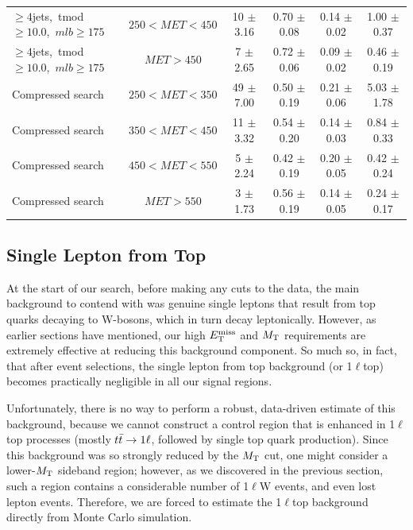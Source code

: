 \begin{table}
\begin{tabular}{|l|c|c|c|c|c|}
\hline
 $\ge4$jets,~tmod$\ge10.0$,~$mlb\ge175$    & $250<MET<450$ & 10 $\pm$ 3.16   & 0.70 $\pm$ 0.08  & 0.14 $\pm$ 0.02 & 1.00 $\pm$ 0.37 \\
 $\ge4$jets,~tmod$\ge10.0$,~$mlb\ge175$    & $MET>450$     & 7 $\pm$ 2.65    & 0.72 $\pm$ 0.06  & 0.09 $\pm$ 0.02 & 0.46 $\pm$ 0.19 \\
\hline
Compressed search & $250<MET<350$  & 49 $\pm$ 7.00  & 0.50 $\pm$ 0.19  & 0.21 $\pm$ 0.06  & 5.03 $\pm$ 1.78  \\
Compressed search & $350<MET<450$  & 11 $\pm$ 3.32  & 0.54 $\pm$ 0.20  & 0.14 $\pm$ 0.03  & 0.84 $\pm$ 0.33  \\
Compressed search & $450<MET<550$  & 5 $\pm$ 2.24   & 0.42 $\pm$ 0.19  & 0.20 $\pm$ 0.05  & 0.42 $\pm$ 0.24  \\
Compressed search & $MET>550$      & 3 $\pm$ 1.73  & 0.56 $\pm$ 0.19  & 0.14 $\pm$ 0.05  & 0.24 $\pm$ 0.17  \\
\hline
\end{tabular}
\end{table}

\subsection{Single Lepton from Top}
\label{ssec:stop:1ltop}

At the start of our search, before making any cuts to the data, the
main background to contend with was genuine single leptons that result
from top quarks decaying to W-bosons, which in turn decay
leptonically. However, as earlier sections have mentioned, our high
$E_\text{T}^\text{miss}$ and $M_\text{T}$ requirements are extremely effective at reducing this
background component. So much so, in fact, that after event
selections, the single lepton from top background (or 1$\ell$top) becomes
practically negligible in all our signal regions.

Unfortunately, there is no way to perform a robust, data-driven
estimate of this background, because we cannot construct a control
region that is enhanced in 1$\ell$top processes (mostly $t\bar{t} \rightarrow 1\ell$,
followed by single top quark production). Since this background was so
strongly reduced by the $M_\text{T}$ cut, one might consider a lower-$M_\text{T}$
sideband region; however, as we discovered in the previous section,
such a region contains a considerable number of 1$\ell$W events, and
even lost lepton events. Therefore, we are forced to estimate the
1$\ell$top background directly from Monte Carlo simulation.

